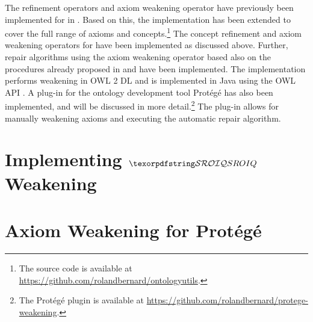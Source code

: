 
The refinement operators and axiom weakening operator have previously been implemented for \ALC in \cite{troquard2018repairing}. Based on this, the implementation has been extended to cover the full range of \SROIQ axioms and concepts.\footnote{The source code is available at \url{https://github.com/rolandbernard/ontologyutils}.} The concept refinement and axiom weakening operators for \SROIQ have been implemented as discussed above. Further, repair algorithms using the axiom weakening operator based also on the procedures already proposed in \cite{troquard2018repairing} and \cite{confalonieri2020towards} have been implemented. The implementation performs weakening in OWL 2 DL \cite{motik2012ontology} and is implemented in Java using the OWL API \cite{horridge2011owl,owlapi,matentzoglu2016introduction}. A plug-in for the ontology development tool Protégé has also been implemented, and will be discussed in more detail.\footnote{The Protégé plugin is available at \url{https://github.com/rolandbernard/protege-weakening}.} The plug-in allows for manually weakening axioms and executing the automatic repair algorithm.

\section{Implementing \texorpdfstring{$\SROIQ$}{SROIQ} Weakening}\label{prototype}



\section{Axiom Weakening for Protégé}\label{protege}


